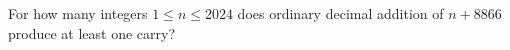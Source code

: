 For how many integers $1\le n\le2024$ does ordinary decimal addition of $n+8866$ produce at least one carry?
